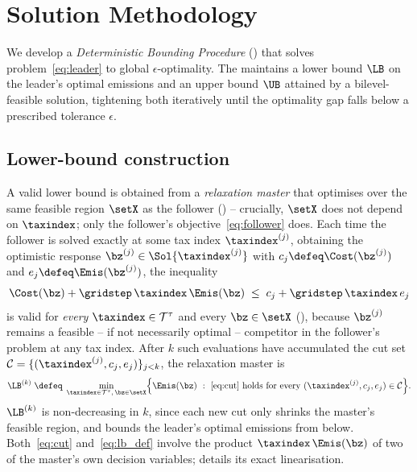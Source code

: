 
\section{Solution Methodology}
\label{sec:methodology}

We develop a \emph{Deterministic Bounding Procedure} (\DBP) that
solves problem~\eqref{eq:leader} to global $\epsilon$-optimality.
The \DBP maintains a lower bound $\LB$ on the leader's optimal
emissions and an upper bound $\UB$ attained by a bilevel-feasible
solution, tightening both iteratively until the optimality gap falls
below a prescribed tolerance $\epsilon$.

\subsection{Lower-bound construction}
\label{sec:method:lb}

A valid lower bound is obtained from a \emph{relaxation master} that
optimises over the same feasible region $\setX$ as the follower
() -- crucially, $\setX$ does not depend on
$\taxindex$; only the follower's objective~\eqref{eq:follower} does.
Each time the follower is solved exactly at some tax index
$\taxindex^{(j)}$, obtaining the optimistic response
$\bz^{(j)}\in\Sol{\taxindex^{(j)}}$ with $c_{j}\defeq\Cost(\bz^{(j)})$
and $e_{j}\defeq\Emis(\bz^{(j)})$, the inequality
\begin{equation}\label{eq:cut}
\Cost(\bz)+\gridstep\,\taxindex\,\Emis(\bz)
\;\le\;
c_{j}+\gridstep\,\taxindex\,e_{j}
\end{equation}
is valid for \emph{every} $\taxindex\in\mathcal{T}^{\tau}$ and every
$\bz\in\setX$ (), because $\bz^{(j)}$ remains a
feasible -- if not necessarily optimal -- competitor in the
follower's problem at any tax index. After $k$ such evaluations have
accumulated the cut set $\mathcal{C}=\{(\taxindex^{(j)},c_{j},e_{j})\}_{j<k}$,
the relaxation master is
\begin{equation}\label{eq:lb_def}
\LB^{(k)} \;\defeq\;
\min_{\taxindex\in\mathcal{T}^{\tau},\,\bz\in\setX}
\Bigl\{\Emis(\bz)\ :\ \eqref{eq:cut}\text{ holds for every }
(\taxindex^{(j)},c_{j},e_{j})\in\mathcal{C}\Bigr\}.
\end{equation}
$\LB^{(k)}$ is non-decreasing in $k$, since each new cut only shrinks
the master's feasible region, and bounds the leader's optimal
emissions from below. Both~\eqref{eq:cut} and~\eqref{eq:lb_def}
involve the product $\taxindex\,\Emis(\bz)$ of two of the master's own
decision variables;  details its exact
\MILP linearisation.

